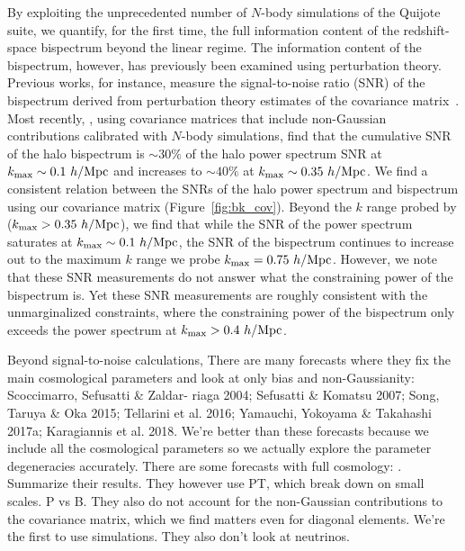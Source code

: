 By exploiting the unprecedented number of $N$-body simulations of the Quijote 
suite, we quantify, for the first time, the full information content of the 
redshift-space bispectrum beyond the linear regime. The information content 
of the bispectrum, however, has previously been examined using perturbation 
theory. Previous works, for instance, measure the signal-to-noise ratio (SNR) 
of the bispectrum derived from perturbation theory estimates of the covariance 
matrix~\citep[\emph{e.g.}][]{sefusatti2005, chan2017}. Most recently, \cite{chan2017},
using covariance matrices that include non-Gaussian contributions calibrated with 
$N$-body simulations, find that the cumulative SNR of the halo bispectrum is 
$\sim 30\%$ of the halo power spectrum SNR at $k_{\rm max} \sim 0.1~h/{\rm Mpc}$ and 
increases to $\sim 40\%$ at $k_{\rm max}\sim 0.35~h/{\rm Mpc}$. We find a consistent 
relation between the SNRs of the halo power spectrum and bispectrum using our 
covariance matrix (Figure~\ref{fig:bk_cov}). Beyond the $k$ range probed by 
\cite{chan2017} ($k_{\rm max}>0.35~h/{\rm Mpc}$), we find that while the SNR of the power spectrum saturates
at $k_{\rm max}\sim 0.1~h/{\rm Mpc}$, the SNR of the bispectrum continues to increase 
out to the maximum $k$ range we probe $k_{\rm max} = 0.75~h/{\rm Mpc}$. However, 
we note that these SNR measurements do not answer what the constraining power of 
the bispectrum is. Yet these SNR measurements are roughly consistent with the 
unmarginalized constraints, where the constraining power of the bispectrum only 
exceeds the power spectrum at $k_{\rm max} > 0.4~h/{\rm Mpc}$. 




Beyond signal-to-noise calculations, 
There are many forecasts where they fix the main cosmological parameters and look at 
only bias and non-Gaussianity: Scoccimarro, Sefusatti \& Zaldar- riaga 2004; Sefusatti \& Komatsu 2007; 
Song, Taruya \& Oka 2015; Tellarini et al. 2016; Yamauchi, Yokoyama \& Takahashi 2017a; 
Karagiannis et al. 2018. We're better than these forecasts because we include all the cosmological 
parameters so we actually explore the parameter degeneracies accurately. 
There are some forecasts with full cosmology: \cite{sefusatti2005, yankelevich2019}. Summarize 
their results. They however use PT, which break down on small scales. P vs B. They also do not account for
the non-Gaussian contributions to the covariance matrix, which we find matters even for diagonal elements. 
We're the first to use simulations. They also don't look at neutrinos. 

